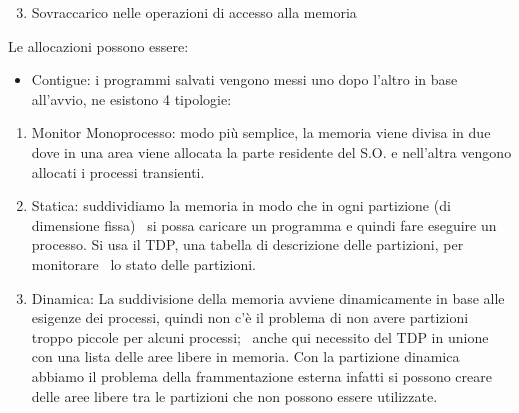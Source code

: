 \documentclass[
]{article}
\providecommand{\tightlist}{%
  \setlength{\itemsep}{0pt}\setlength{\parskip}{0pt}}
\begin{document}
{}

\begin{enumerate}
\setcounter{enumi}{2}
\tightlist
\item
  {Sovraccarico nelle operazioni di accesso alla memoria}
\end{enumerate}

{}

{}

{}

{}

{}

{}

{Le allocazioni possono essere:}

{}

\begin{itemize}
\tightlist
\item
  {Contigue}{: i programmi salvati vengono messi uno dopo l'altro in
  base all'avvio, ne esistono 4 tipologie: }
\end{itemize}

\begin{enumerate}
\tightlist
\item
  {Monitor Monoprocesso}{: modo più semplice, la memoria viene divisa in
  due dove in una area viene allocata la parte residente del S.O. e
  nell'altra vengono allocati i processi transienti.}
\end{enumerate}

{}

\begin{enumerate}
\setcounter{enumi}{1}
\tightlist
\item
  {Statica}{: suddividiamo la memoria in modo che in ogni partizione (di
  dimensione fissa) ~si possa caricare un programma e quindi fare
  eseguire un processo. Si usa il TDP, una tabella di descrizione delle
  partizioni, per monitorare ~lo stato delle partizioni.}
\end{enumerate}

{}

\begin{enumerate}
\setcounter{enumi}{2}
\tightlist
\item
  {Dinamica}{: La suddivisione della memoria avviene dinamicamente in
  base alle esigenze dei processi, quindi non c'è il problema di non
  avere partizioni troppo piccole per alcuni processi; ~anche qui
  necessito del TDP in unione con una lista delle aree libere in
  memoria. Con la partizione dinamica abbiamo il problema della
  frammentazione esterna infatti si possono creare delle aree libere tra
  le partizioni che non possono essere utilizzate.}
\end{enumerate}
\end{document}
